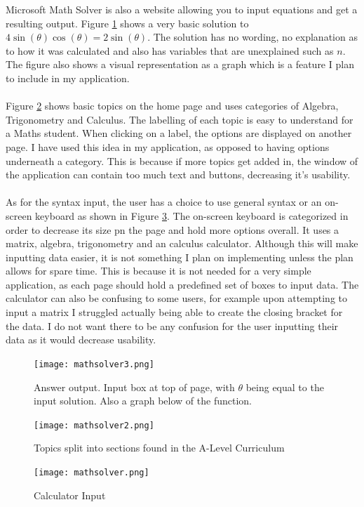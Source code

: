 \documentclass[final]{cmpreport}
\begin{document}
	Microsoft Math Solver \cite{math} is also a website allowing you to input equations and get a resulting output. Figure \ref{fig:output} shows a very basic solution to $ 4 \sin (   \theta     )   \cos (   \theta     )   =  2 \sin (   \theta     )   $. The solution has no wording, no explanation as to how it was calculated and also has variables that are unexplained such as $n$. The figure also shows a visual representation as a graph which is a feature I plan to include in my application.\\
	\\Figure \ref{fig:topic} shows basic topics on the home page and uses categories of Algebra, Trigonometry and Calculus. The labelling of each topic is easy to understand for a Maths student. When clicking on a label, the options are displayed on another page. I have used this idea in my application, as opposed to having options underneath a category. This is because if more topics get added in, the window of the application can contain too much text and buttons, decreasing it's usability.\\
	\\As for the syntax input, the user has a choice to use general syntax or an on-screen keyboard as shown in Figure \ref{fig:calc}. The on-screen keyboard is categorized in order to decrease its size pn the page and hold more options overall. It uses a matrix, algebra, trigonometry and an calculus calculator. Although this will make inputting data easier, it is not something I plan on implementing unless the plan allows for spare time. This is because it is not needed for a very simple application, as each page should hold a predefined set of boxes to input data. The calculator can also be confusing to some users, for example upon attempting to input a matrix I struggled actually being able to create the closing bracket for the data. I do not want there to be any confusion for the user inputting their data as it would decrease usability. \\
	\begin{figure}[H]
		\caption{Answer output. Input box at top of page, with $\theta$ being equal to the input solution. Also a graph below of the function. }
		\centering
		\texttt{[image: mathsolver3.png]}
		\label{fig:output}
	\end{figure}
	\begin{figure}[H]
		\caption{Topics split into sections found in the A-Level Curriculum}
		\centering
		\texttt{[image: mathsolver2.png]}
		\label{fig:topic}
		\end{figure}
	\begin{figure}[H]
		\caption{Calculator Input}
		\centering
		\texttt{[image: mathsolver.png]}
		\label{fig:calc}
	\end{figure}
	
\end{document}
